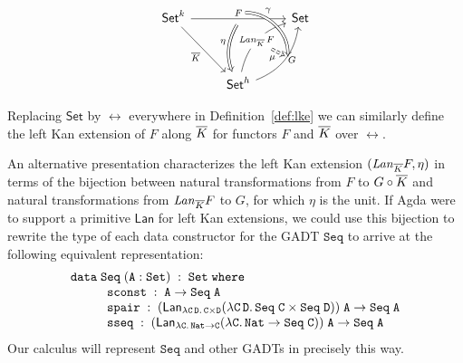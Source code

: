\documentclass{lmcs}
\theoremstyle{plain}\newtheorem{satz}[thm]{Satz}
\newcommand{\set}{\mathsf{Set}}
\begin{document}
{\begin{defi}
\[
\begin{tikzcd}[row sep = huge]
\set^k
\ar[rr, "{F}"{name=Fa, above}, ""{name=F, below}]
\ar[rd, "{\ol K}"']
&& \set \\
& \set^h
\ar[Rightarrow, bend right = 25, from=F, "{\eta}"']
\ar[ur, bend left, "{\mathit{Lan}_{\ol K}\,F}"{name=Lan, description}]
\ar[ur, bend right, "{G}"'{name=L, right}, ""'{name=Lr, right}]
\ar[Rightarrow, bend left = 45, from=Fa, to=Lr, "{\gamma}" near start]
\ar[Rightarrow, dashed, from=Lan, to=L, "{\mu}"']
\end{tikzcd}
\]

\vspace*{0.05in}

\noindent
Replacing $\set$ by $\rel$ everywhere in Definition~\ref{def:lke} we
can similarly define the left Kan extension of $F$ along $\overline{K}$ for
functors $F$ and $\overline{K}$ over $\rel$.
\end{defi}

An alternative presentation characterizes the left Kan extension
$(\mathit{Lan}_{\overline{K}} F, \eta)$ in terms of the bijection between
natural transformations from $F$ to $G \circ \overline{K}$ and natural
transformations from $\mathit{Lan}_{\overline{K}} F$ to $G$, for which
$\eta$ is the unit. If Agda were to support a primitive
$\mathsf{Lan}$ for left Kan extensions, we could use this bijection
to rewrite the type of each data constructor for the GADT
$\mathtt{Seq}$ to arrive at the following equivalent representation:
\[\begin{array}{l}
\mathtt{data\; Seq \;(A : Set)\;:\;Set\;where}\\
\hspace*{0.4in}\mathtt{sconst\;:\; A \rightarrow Seq\;A}\\
\hspace*{0.4in}\mathtt{spair\;:\;(\mathsf{Lan}_{\lambda C\,D.\,C \times D}
  (\lambda C\,D.\,Seq\;C\times Seq\;D))\;A \rightarrow Seq\;A}\\ 
\hspace*{0.4in}\mathtt{sseq\;:\;(\mathsf{Lan}_{\lambda C.\,Nat \to C}
  (\lambda C.\,Nat \rightarrow Seq\;C))\;A \rightarrow
  Seq\;A}
\end{array}\]
\noindent
\!\!Our calculus will represent $\mathtt{Seq}$ and other GADTs in
precisely this way.

\vspace*{0.05in}

}
\end{document}
